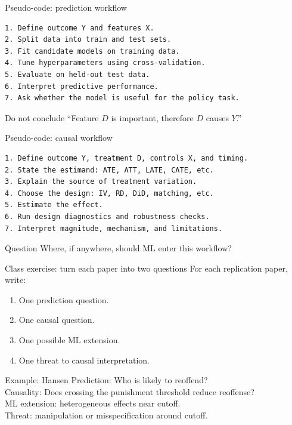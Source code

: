 \documentclass[aspectratio=169,11pt]{beamer}
\begin{document}
\begin{frame}[fragile]{Pseudo-code: prediction workflow}
\begin{verbatim}
1. Define outcome Y and features X.
2. Split data into train and test sets.
3. Fit candidate models on training data.
4. Tune hyperparameters using cross-validation.
5. Evaluate on held-out test data.
6. Interpret predictive performance.
7. Ask whether the model is useful for the policy task.
\end{verbatim}
\begin{alertblock}{Do not conclude}
``Feature $D$ is important, therefore $D$ causes $Y$.''
\end{alertblock}
\end{frame}

\begin{frame}[fragile]{Pseudo-code: causal workflow}
\begin{verbatim}
1. Define outcome Y, treatment D, controls X, and timing.
2. State the estimand: ATE, ATT, LATE, CATE, etc.
3. Explain the source of treatment variation.
4. Choose the design: IV, RD, DiD, matching, etc.
5. Estimate the effect.
6. Run design diagnostics and robustness checks.
7. Interpret magnitude, mechanism, and limitations.
\end{verbatim}
\begin{block}{Question}
Where, if anywhere, should ML enter this workflow?
\end{block}
\end{frame}

\begin{frame}{Class exercise: turn each paper into two questions}
For each replication paper, write:
\begin{enumerate}
  \item One prediction question.
  \item One causal question.
  \item One possible ML extension.
  \item One threat to causal interpretation.
\end{enumerate}
\begin{exampleblock}{Example: Hansen}
Prediction: Who is likely to reoffend? \\
Causality: Does crossing the punishment threshold reduce reoffense? \\
ML extension: heterogeneous effects near cutoff. \\
Threat: manipulation or misspecification around cutoff.
\end{exampleblock}
\end{frame}
\end{document}
